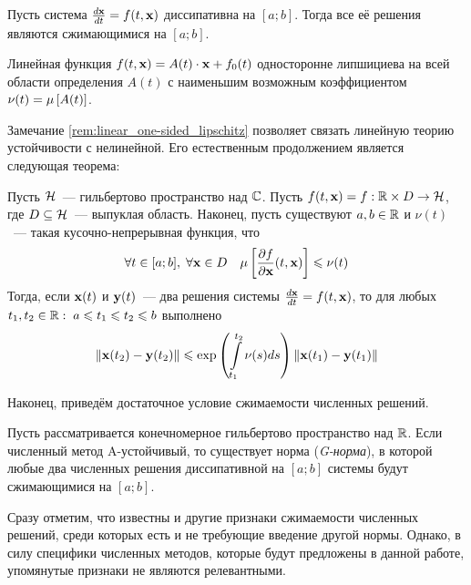 \begin{statement}
    \label{def:contractivity_condition}
    Пусть система $ \frac{d \mathbf{x}}{d t} = f(t, \mathbf{x}) $ диссипативна на $ [a; b] $.
    Тогда все её решения являются сжимающимися на $ [a; b] $.
\end{statement}

\begin{remark}
    \label{rem:linear_one-sided_lipschitz}
    Линейная функция $ f(t, \mathbf{x}) = A(t) \cdot \mathbf{x} + f_0(t) $ односторонне липшициева на всей области определения $ A(t) $
    с наименьшим возможным коэффициентом $ \nu(t) = \mu \left[ A(t) \right] $.
\end{remark}

Замечание \ref{rem:linear_one-sided_lipschitz} позволяет связать линейную теорию устойчивости с нелинейной.
Его естественным продолжением является следующая теорема:

\begin{theorem}[Далквист, 1959]
    \label{thm:nonlinear_to_linear}
    Пусть $ \mathcal{H} $~--- гильбертово пространство над $ \mathbb{C} $.
    Пусть $ f(t, \mathbf{x}) = f: \mathbb{R} \times D \to \mathcal{H} $,
    где $ D \subseteq \mathcal{H} $~--- выпуклая область.
    Наконец, пусть существуют $ a, b \in \mathbb{R} $ и $ \nu(t) $~--- такая кусочно-непрерывная функция, что
    \[
        \forall t \in [a; b], \; \forall \mathbf{x} \in D \quad \mu \left[ \frac{\partial f}{\partial \mathbf{x}}(t, \mathbf{x}) \right] \leqslant \nu(t)
    \]
    Тогда, если $ \mathbf{x}(t) $ и $ \mathbf{y}(t) $~--- два решения системы $ \frac{d \mathbf{x}}{d t} = f(t, \mathbf{x}) $,
    то для любых $ t_1, t_2 \in \mathbb{R}: \; a \leqslant t_1 \leqslant t_2 \leqslant b $ выполнено
    \[
        \| \mathbf{x}(t_2) - \mathbf{y}(t_2) \| \leqslant \exp\left( \int\limits_{t_1}^{t_2} \nu(s) ds \right) \| \mathbf{x}(t_1) - \mathbf{y}(t_1) \|
    \]
\end{theorem}

Наконец, приведём достаточное условие сжимаемости численных решений.

\begin{theorem}[Далквист, 1978]
    Пусть рассматривается конечномерное гильбертово пространство над $ \mathbb{R} $.
    Если численный метод A-устойчивый, то существует норма (\emph{G-норма}),
    в которой любые два численных решения диссипативной на $ [a; b] $ системы будут сжимающимися на $ [a; b] $.
\end{theorem}

Сразу отметим, что известны и другие признаки сжимаемости численных решений,
среди которых есть и не требующие введение другой нормы.
Однако, в силу специфики численных методов, которые будут предложены в данной работе,
упомянутые признаки не являются релевантными.

